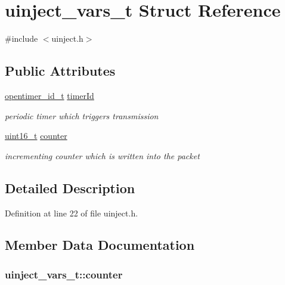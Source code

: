 \hypertarget{structuinject__vars__t}{}\section{uinject\+\_\+vars\+\_\+t Struct Reference}
\label{structuinject__vars__t}


{\ttfamily \#include $<$uinject.\+h$>$}

\subsection*{Public Attributes}
\begin{DoxyCompactItemize}
\item 
\hyperlink{group___open_timers_gae5ca9e65d270cdfa4bc74008d96d69ab}{opentimer\+\_\+id\+\_\+t} \hyperlink{structuinject__vars__t_a18a921b840a55a17d55c43086741b74a}{timer\+Id}
\begin{DoxyCompactList}\small\item\em periodic timer which triggers transmission \end{DoxyCompactList}\item 
\hyperlink{_p_e___types_8h_a1f1825b69244eb3ad2c7165ddc99c956}{uint16\+\_\+t} \hyperlink{structuinject__vars__t_a97940d6759ea18706492ae05ad24730f}{counter}
\begin{DoxyCompactList}\small\item\em incrementing counter which is written into the packet \end{DoxyCompactList}\end{DoxyCompactItemize}


\subsection{Detailed Description}


Definition at line 22 of file uinject.\+h.



\subsection{Member Data Documentation}
\subsubsection[{\texorpdfstring{counter}{counter}}]{ uinject\+\_\+vars\+\_\+t\+::counter}\hypertarget{structuinject__vars__t_a97940d6759ea18706492ae05ad24730f}{}\label{structuinject__vars__t_a97940d6759ea18706492ae05ad24730f}



